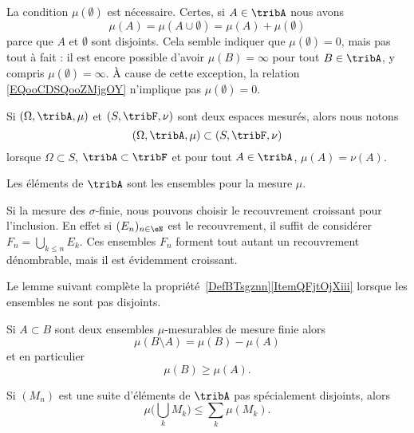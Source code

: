 \begin{remark}
    La condition \( \mu(\emptyset)\) est nécessaire. Certes, si \( A\in \tribA\) nous avons
    \begin{equation}        \label{EQooCDSQooZMjgOY}
        \mu(A)=\mu(A\cup \emptyset)=\mu(A)+\mu(\emptyset)
    \end{equation}
    parce que \( A\) et \( \emptyset\) sont disjoints. Cela semble indiquer que \( \mu(\emptyset)=0\), mais pas tout à fait : il est encore possible d'avoir \( \mu(B)=\infty\) pour tout \( B\in\tribA\), y compris \( \mu(\emptyset)=\infty\). À cause de cette exception, la relation \eqref{EQooCDSQooZMjgOY} n'implique pas \( \mu(\emptyset)=0\).
\end{remark}

Si \( (\Omega,\tribA,\mu)\) et \( (S,\tribF,\nu)\) sont deux espaces mesurés, alors nous notons
\begin{equation}
    (\Omega,\tribA,\mu)\subset (S,\tribF,\nu)
\end{equation}
lorsque \( \Omega\subset S\), \( \tribA\subset\tribF\) et pour tout \( A\in\tribA\), \( \mu(A)=\nu(A)\).

\begin{definition}\label{DefHGsQxHB}
    Les éléments de \( \tribA\) sont les ensembles  pour la mesure \( \mu\).
\end{definition}

Si la mesure des \( \sigma\)-finie, nous pouvons choisir le recouvrement croissant pour l'inclusion. En effet si \( (E_n)_{n\in \eN}\) est le recouvrement, il suffit de considérer \( F_n=\bigcup_{k\leq n}E_k\). Ces ensembles \( F_n\) forment tout autant un recouvrement dénombrable, mais il est évidemment croissant.

Le lemme suivant complète la propriété~\ref{DefBTsgznn}\ref{ItemQFjtOjXiii} lorsque les ensembles ne sont pas disjoints.
\begin{lemma} \label{LemPMprYuC}
    Si \( A\subset B\) sont deux ensembles \( \mu\)-mesurables de mesure finie alors
    \begin{equation}
        \mu(B\setminus A)=\mu(B)-\mu(A)
    \end{equation}
    et en particulier
    \begin{equation}
        \mu(B)\geq \mu(A).
    \end{equation}

    Si \( (M_n)\) est une suite d'éléments de \( \tribA\) pas spécialement disjoints, alors
    \begin{equation}\label{EqWWFooYPCTt}
        \mu\big( \bigcup_kM_k \big)\leq \sum_{k}\mu(M_k).
    \end{equation}
\end{lemma}

